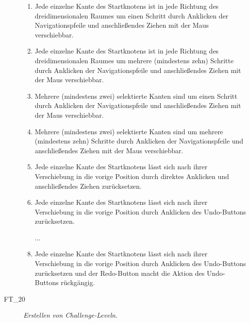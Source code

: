 \begin{description}
\begin{enumerate}
		\item Jede einzelne Kante des Startknotens ist in jede Richtung des dreidimensionalen Raumes um einen Schritt durch Anklicken der Navigationspfeile und anschließendes Ziehen mit der Maus verschiebbar.
		\item Jede einzelne Kante des Startknotens ist in jede Richtung des dreidimensionalen Raumes um mehrere (mindestens zehn) Schritte durch Anklicken der Navigationspfeile und anschließendes Ziehen mit der Maus verschiebbar.
		\item Mehrere (mindestens zwei) selektierte Kanten sind um einen Schritt durch Anklicken der Navigationspfeile und anschließendes Ziehen mit der Maus verschiebbar.
		\item Mehrere (mindestens zwei) selektierte Kanten sind um mehrere (mindestens zehn) Schritte durch Anklicken der Navigationspfeile und anschließendes Ziehen mit der Maus verschiebbar.
		
		\item Jede einzelne Kante des Startknotens lässt sich nach ihrer Verschiebung in die vorige Position durch direktes Anklicken und anschließendes Ziehen zurücksetzen.
		\item Jede einzelne Kante des Startknotens lässt sich nach ihrer Verschiebung in die vorige Position durch Anklicken des \glqq Undo\grqq-Buttons zurücksetzen.
		
		\item[...]
		
\clearpage
		
		\item Jede einzelne Kante des Startknotens lässt sich nach ihrer Verschiebung in die vorige Position durch Anklicken des \glqq Undo\grqq-Buttons zurücksetzen und der \glqq Redo\grqq-Button macht die Aktion des \glqq Undo\grqq-Buttons rückgängig.
		~\\
	
	\end{enumerate}



\label{FT:20}

	\item[FT\_20] \textit{Erstellen von Challenge-Leveln.} \hfill\\
	
	\begin{enumerate}
	

\end{enumerate}
\end{description}
